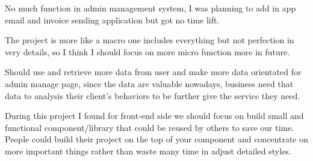 \documentclass[
  paper=a4,
  ,captions=tableheading
]{scrartcl}
\begin{document}
No much function in admin management system, I was planning to add in
app email and invoice sending application but got no time lift.

The project is more like a macro one includes everything but not
perfection in very details, so I think I should focus on more micro
function more in future.

Should use and retrieve more data from user and make more data
orientated for admin manage page, since the data are valuable nowadays,
business need that data to analysis their client's behaviors to be
further give the service they need.

During this project I found for front-end side we should focus on build
small and functional component/library that could be reused by others to
save our time. People could build their project on the top of your
component and concentrate on more important things rather than waste
many time in adjust detailed styles.
\end{document}
